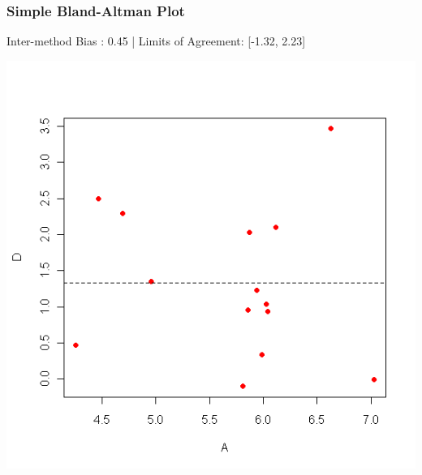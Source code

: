 \documentclass[compress]{beamer}        %
\begin{document}
\begin{frame}
\frametitle{Simple Bland-Altman Plot}
Inter-method Bias : 0.45 | Limits of Agreement: [-1.32, 2.23]
\vspace{-0.5cm}
\begin{center}
\includegraphics[scale = 0.40]{SimpleBAplot}
\end{center}
\end{frame}
\end{document}
